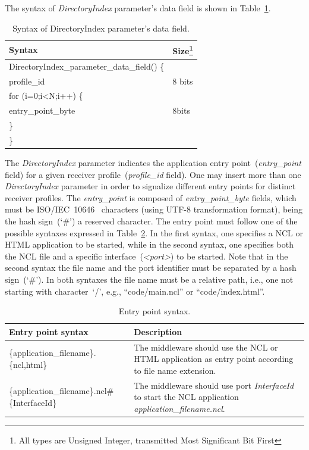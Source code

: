 \documentclass[11pt]{article}
\begin{document}
The syntax of \emph{DirectoryIndex}
parameter's data field is shown in Table~\ref{dirsyn}.

\begin{table}[H]
\centering
\caption{Syntax of DirectoryIndex parameter's data field.}
\label{dirsyn}
\begin{tabular}{|l|l|}
  \hline
  Syntax & Size\footnote{All types are Unsigned Integer, transmitted Most Significant Bit First} \\
  \hline
  DirectoryIndex\_parameter\_data\_field() \{ &  \\
  \hline
  \hspace{5mm} profile\_id & 8 bits \\
  \hline
  \hspace{5mm} for (i=0;i<N;i++) \{ & \\
  \hline
  \hspace{10mm} entry\_point\_byte & 8bits \\
  \hline
  \hspace{5mm} \} & \\
  \hline
  \} & \\
  \hline
\end{tabular}
\end{table}

The \emph{DirectoryIndex} parameter indicates the application entry
point~(\emph{entry\_point} field)
for a given receiver profile~(\emph{profile\_id} field).  One may insert
more than one \emph{DirectoryIndex} parameter in order to signalize
different entry points for distinct receiver profiles. The
\emph{entry\_point} is composed of \emph{entry\_point\_byte} fields, which
must be ISO/IEC~10646~\cite{ISO-10646-2014} characters (using UTF-8
transformation format), being the hash sign~(`\#') a
reserved character. The entry point must follow one of the possible syntaxes
expressed in Table~\ref{entrypt}.  In the first syntax, one specifies a NCL
or HTML application to be started, while in the second syntax, one specifies
both the NCL file and a specific interface~(\emph{<port>}) to be started.  Note that
in the second syntax the file name and the port identifier must be separated
by a hash sign~(`\#'). In both syntaxes the file name must be a relative
path, i.e., one not starting with character~`/', e.g., ``code/main.ncl'' or
``code/index.html''.

\begin{table}[H]
\centering
\caption{Entry point syntax.}
\label{entrypt}
\begin{tabularx}{\textwidth}{|p{7cm}|X|}
  \hline
  Entry point syntax & Description\\
  \hline
  \{application\_filename\}.\{ncl,html\} & The middleware should use the
  NCL or HTML application as entry point according to file name extension.\\
  \hline
  \{application\_filename\}.ncl\#\{InterfaceId\} & The middleware should use port
  \emph{InterfaceId} to start the NCL application \emph{application\_filename.ncl}.\\
  \hline
\end{tabularx}
\end{table}
\end{document}
